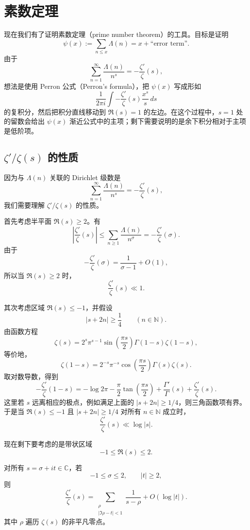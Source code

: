 \chapter{素数定理}
\label{chap:prime-number-theorem}

现在我们有了证明素数定理（prime number theorem）的工具。目标是证明
\[
	\psi(x)
	:=
	\sum_{n\leq x}\Lambda(n)
	=
	x+\text{``error term''}.
\]
由于
\[
	\sum_{n=1}^{\infty}\frac{\Lambda(n)}{n^s}
	=
	-\frac{\zeta'}{\zeta}(s),
\]
想法是使用 Perron 公式（Perron's formula），把 $\psi(x)$ 写成形如
\[
	\frac{1}{2\pi i}
	\int
	-\frac{\zeta'}{\zeta}(s)\frac{x^s}{s}\,ds
\]
的复积分，然后把积分直线移动到 $\Re(s)=1$ 的左边。在这个过程中，$s=1$ 处的留数会给出 $\psi(x)$ 渐近公式中的主项；剩下需要说明的是余下积分相对于主项是低阶项。

\section{\texorpdfstring{\(\zeta'/\zeta(s)\)}{zeta'/zeta(s)} 的性质}

因为与 $\Lambda(n)$ 关联的 Dirichlet 级数是
\[
	\sum_{n=1}^{\infty}\frac{\Lambda(n)}{n^s}
	=
	-\frac{\zeta'}{\zeta}(s),
\]
我们需要理解 $\zeta'/\zeta(s)$ 的性质。

首先考虑半平面 $\Re(s)\geq 2$。有
\[
	\left|\frac{\zeta'}{\zeta}(s)\right|
	\leq
	\sum_{n\geq1}\frac{\Lambda(n)}{n^\sigma}
	=
	-\frac{\zeta'}{\zeta}(\sigma).
\]
由于
\[
	-\frac{\zeta'}{\zeta}(\sigma)
	=
	\frac1{\sigma-1}+O(1),
\]
所以当 $\Re(s)\geq 2$ 时，
\begin{equation}
	\frac{\zeta'}{\zeta}(s)\ll 1.
	\tag{10.1}
\end{equation}

其次考虑区域 $\Re(s)\leq -1$，并假设
\[
	|s+2n|\geq \frac14
	\qquad (n\in\mathbb N).
\]
由函数方程
\[
	\zeta(s)
	=
	2^s\pi^{s-1}\sin\left(\frac{\pi s}{2}\right)\Gamma(1-s)\zeta(1-s),
\]
等价地，
\[
	\zeta(1-s)
	=
	2^{-s}\pi^{-s}\cos\left(\frac{\pi s}{2}\right)\Gamma(s)\zeta(s).
\]
取对数导数，得到
\[
	-\frac{\zeta'}{\zeta}(1-s)
	=
	-\log 2\pi
	-\frac{\pi}{2}\tan\left(\frac{\pi s}{2}\right)
	+\frac{\Gamma'}{\Gamma}(s)
	+\frac{\zeta'}{\zeta}(s).
\]
这里若 $s$ 远离相应的极点，例如满足上面的 $|s+2n|\geq 1/4$，则三角函数项有界。于是当 $\Re(s)\leq -1$ 且
$|s+2n|\geq 1/4$ 对所有 $n\in\mathbb N$ 成立时，
\[
	\frac{\zeta'}{\zeta}(s)\ll \log |s|.
\]

现在剩下要考虑的是带状区域
\[
	-1\leq \Re(s)\leq 2.
\]

\begin{lemma}[原文 Lemma 10.1]
	对所有 $s=\sigma+it\in\mathbb C$，若
	\[
		-1\leq \sigma\leq 2,
		\qquad
		|t|\geq 2,
	\]
	则
	\[
		\frac{\zeta'}{\zeta}(s)
		=
			\sum_{\substack{\rho\\ |\Im\rho-t|<1}}
			\frac1{s-\rho}
			+
			O(\log |t|).
		\]
		其中 $\rho$ 遍历 $\zeta(s)$ 的非平凡零点。
	\end{lemma}

